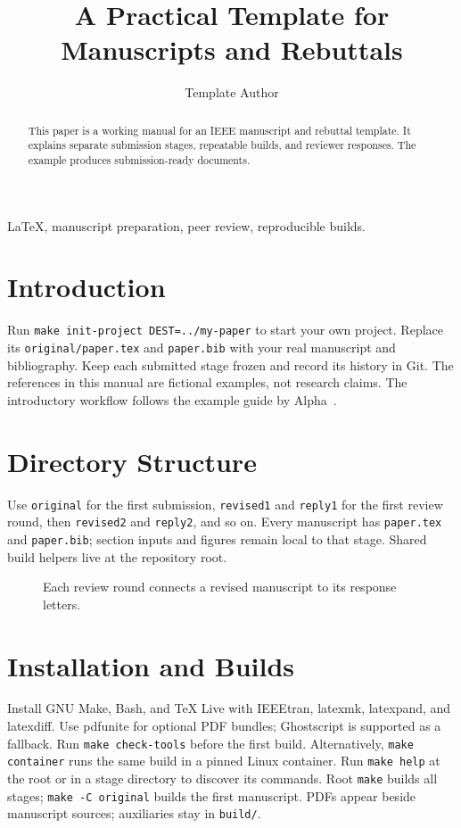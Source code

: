 \documentclass[journal]{IEEEtran}
\title{A Practical Template for Manuscripts and Rebuttals}
\author{Template Author}
\begin{document}
\maketitle
\begin{abstract}
This paper is a working manual for an IEEE manuscript and rebuttal template.
It explains separate submission stages, repeatable builds, and reviewer responses.
The example produces submission-ready documents.
\end{abstract}
\begin{IEEEkeywords}
LaTeX, manuscript preparation, peer review, reproducible builds.
\end{IEEEkeywords}
\section{Introduction}
Run \texttt{make init-project DEST=../my-paper} to start your own project.
Replace its \texttt{original/paper.tex} and \texttt{paper.bib} with your real manuscript
and bibliography. Keep each submitted stage frozen and record its history in Git.
The references in this manual are fictional examples, not research claims.
The introductory workflow follows the example guide by Alpha~\cite{guide}.
\section{Directory Structure}
Use \texttt{original} for the first submission, \texttt{revised1} and \texttt{reply1}
for the first review round, then \texttt{revised2} and \texttt{reply2}, and so on.
Every manuscript has \texttt{paper.tex} and \texttt{paper.bib}; section inputs and figures
remain local to that stage. Shared build helpers live at the repository root.
\begin{figure}[!b]
\centering

\caption{Each review round connects a revised manuscript to its response letters.}
\label{fig:workflow}
\end{figure}
\section{Installation and Builds}
Install GNU Make, Bash, and TeX Live with IEEEtran, latexmk, latexpand, and latexdiff.
Use pdfunite for optional PDF bundles; Ghostscript is supported as a fallback.
Run \texttt{make check-tools} before the first build.
Alternatively, \texttt{make container} runs the same build in a pinned Linux container.
Run \texttt{make help} at the root or in a stage directory to discover its commands.
Root \texttt{make} builds all stages; \texttt{make -C original} builds the first manuscript.
PDFs appear beside manuscript sources; auxiliaries stay in \texttt{build/}.

\end{document}
